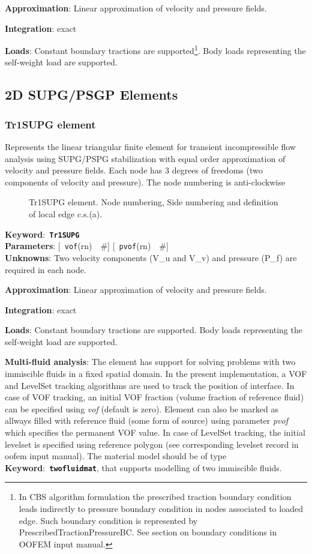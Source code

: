 \documentclass[a4paper]{article}
\newcommand{\descitem}[1]{{\noindent \bf #1}:}
\newcommand{\elemkeyword}[1]{\descitem{Keyword}~{\bf \texttt{#1}}}
\newcommand{\elemparam}[2]{{{\texttt{#1}\tiny (#2)}~~\#}}
\newcommand{\optelemparam}[2]{{[~\elemparam{#1}{#2}]}}
\newcommand{\param}[1]{{\em #1}}
\begin{document}
\descitem{Approximation} Linear approximation of velocity and pressure
fields.

\descitem{Integration}
exact

\descitem{Loads} Constant boundary tractions are supported\footnote{In CBS algorithm formulation the prescribed traction
boundary condition leads indirectly to pressure boundary condition in
nodes associated to loaded edge. Such boundary condition is
represented by PrescribedTractionPressureBC. See section on boundary
conditions in OOFEM input manual.}. Body loads
representing the self-weight load are supported.

\subsection{2D SUPG/PSGP Elements}
\subsubsection{Tr1SUPG element}
\label{Tr1SUPG}
Represents the linear triangular finite element for transient
incompressible flow analysis using SUPG/PSPG stabilization with equal order
approximation of velocity and pressure fields. Each node has 3 degrees
of freedoms (two components of velocity and pressure).
The node numbering is anti-clockwise

\begin{figure}[tb]
 \centering
 \begin{makeimage}
  
 \end{makeimage}
 \caption{Tr1SUPG element. Node numbering, Side numbering and
 definition of local edge c.s.(a).}
 \label{Tr1SUPG2fig}
\end{figure}

\elemkeyword{Tr1SUPG}\\
\descitem{Parameters} \optelemparam{vof}{rn}
\optelemparam{pvof}{rn}\\
\descitem{Unknowns}
Two velocity components (V\_u and V\_v) and pressure (P\_f) are required in each node.

\descitem{Approximation} Linear approximation of velocity and pressure
fields.

\descitem{Integration}
exact

\descitem{Loads} Constant boundary tractions are supported. Body loads
representing the self-weight load are supported.

\descitem{Multi-fluid analysis} The element has support for solving
problems with two immiscible fluids in
a fixed spatial domain. In the present implementation, a VOF and LevelSet tracking algorithms
are used to track the position of interface. In case of VOF tracking, an initial VOF fraction
(volume fraction of reference fluid) can be specified using
\param{vof} (default is zero). Element can also be marked as allways
filled with reference fluid (some form of source) using parameter
\param{pvof} which specifies the permanent VOF value. In case of LevelSet tracking, the initial levelset is specified using 
reference polygon (see corresponding levelset record in oofem input manual).
The material model should be of type \elemkeyword{twofluidmat}, that
supports modelling of two immiscible fluids.
\end{document}
